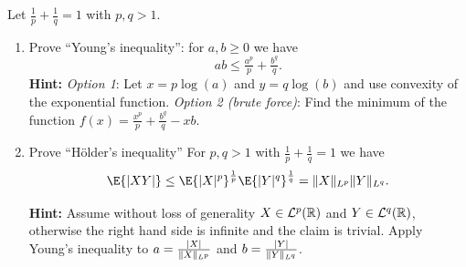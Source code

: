
\begin{exercise}[subtitle={Proof of Hölder's inequality \Coffeecup}]
    \label{ex: hölder's inequality}
    Let \(\frac1p + \frac1q = 1\) with \(p,q > 1\).
    \begin{enumerate}[label=(\alph*)]
        \item\label{it: young inequality}
        Prove ``Young's inequality'': for \(a,b \ge 0\) we have
        \[
            ab \le \tfrac{a^p}p + \tfrac{b^q}q.
        \]
        \textbf{Hint:} \emph{Option 1}: Let \(x = p \log(a)\) and \(y = q \log(b)\)
        and use convexity of the exponential function.
        \emph{Option 2 (brute force)}: Find the minimum of 
        the function \(f(x) = \frac{x^p}p + \frac{b^q}q - xb\).
        \begin{solution}
        \end{solution}

        \item\label{it: holder's inequality proof}
        Prove ``Hölder's inequality'' 
        For \(p,q >1\) with \(\frac1p + \frac1q = 1\) we have
        \[
            \E{\abs{XY}} \le \E{\abs{X}^p}^{\frac1p}\E{\abs{Y}^q}^{\frac1q} = \norm{X}_{L^p} \norm{Y}_{L^q}.
        \]

        \textbf{Hint:} 
        Assume without loss of generality \(X \in \mathcal{L}^p(\mathbb{R})\) and \(Y\in \mathcal{L}^q(\mathbb{R})\),
        otherwise the right hand side is infinite and the claim is trivial.
        Apply Young's inequality to \(a =
        \frac{\lvert X\rvert}{\lVert X\rVert_{L^p}}\) and \(b = \frac{\lvert Y\rvert}{\lVert Y\rVert_{L^q}}\).
    \end{enumerate}
\end{exercise}


